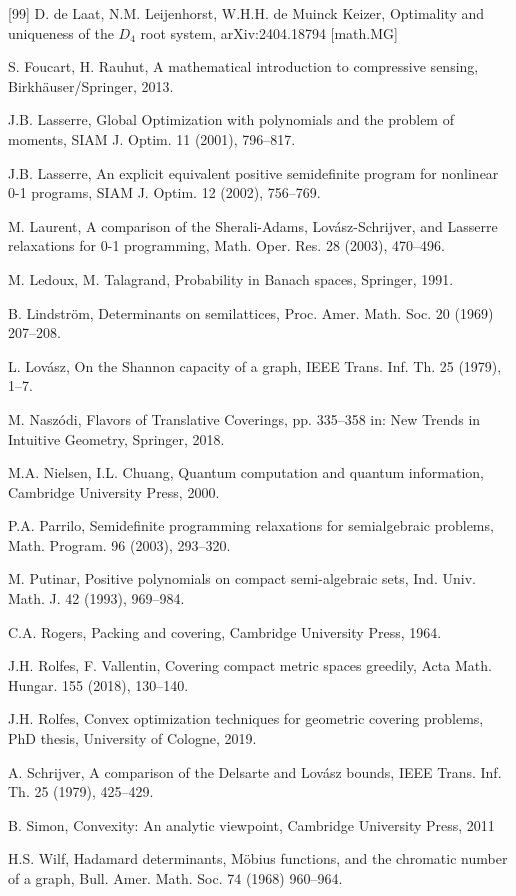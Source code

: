 \documentclass{amsart}
\begin{document}
\begin{thebibliography}{[99]}
D. de Laat, N.M. Leijenhorst, W.H.H. de Muinck Keizer,
Optimality and uniqueness of the $D_4$ root system,
arXiv:2404.18794 [math.MG]

  S. Foucart, H. Rauhut,
  A mathematical introduction to compressive sensing,
  Birkh\"auser/Springer, 2013.

J.B. Lasserre, Global Optimization with polynomials and the problem of moments,
SIAM J. Optim. 11 (2001), 796--817.
  
J.B. Lasserre,
An explicit equivalent positive semidefinite program for nonlinear 0-1 programs,
SIAM J. Optim. 12 (2002), 756--769. 

M. Laurent,
A comparison of the Sherali-Adams, Lov\'asz-Schrijver, and Lasserre relaxations for 0-1 programming,
Math. Oper. Res. 28 (2003), 470--496.

  M. Ledoux, M. Talagrand,
  Probability in Banach spaces,
  Springer, 1991.

B. Lindstr\"om,
Determinants on semilattices, 
Proc. Amer. Math. Soc. 20 (1969) 207--208.

L. Lov\'asz,
On the Shannon capacity of a graph,
IEEE Trans. Inf. Th. 25 (1979), 1--7.

  M. Nasz\'odi,
  Flavors of Translative Coverings,
  pp. 335--358 in: New Trends in Intuitive Geometry, Springer, 2018.

  M.A. Nielsen, I.L. Chuang,
  Quantum computation and quantum information,
  Cambridge University Press, 2000.

P.A. Parrilo, 
Semidefinite programming relaxations for semialgebraic problems, Math. Program. 96 (2003), 293--320.

M. Putinar,
Positive polynomials on compact semi-algebraic sets,
Ind. Univ. Math. J. 42 (1993), 969--984.

  C.A. Rogers,
  Packing and covering,
  Cambridge University Press, 1964.

  J.H. Rolfes, F. Vallentin,
  Covering compact metric spaces greedily,
  Acta Math. Hungar. 155 (2018),  130--140.

  J.H. Rolfes,
  Convex optimization techniques for geometric covering problems,
  PhD thesis, University of Cologne, 2019.
  
A. Schrijver,
A comparison of the Delsarte and Lov\'asz bounds,
IEEE Trans. Inf. Th. 25 (1979), 425--429.

  B. Simon,
  Convexity: An analytic viewpoint,
  Cambridge University Press, 2011

H.S. Wilf,
Hadamard determinants, M\"obius functions, and the chromatic number
  of a graph,
Bull. Amer. Math. Soc. 74 (1968) 960--964.

\end{thebibliography}
\end{document}
